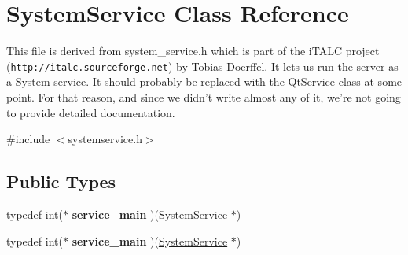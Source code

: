\hypertarget{class_system_service}{\section{System\-Service Class Reference}
\label{class_system_service}
}


This file is derived from system\-\_\-service.\-h which is part of the i\-T\-A\-L\-C project (\href{http://italc.sourceforge.net}{\tt http\-://italc.\-sourceforge.\-net}) by Tobias Doerffel. It lets us run the server as a System service. It should probably be replaced with the Qt\-Service class at some point. For that reason, and since we didn't write almost any of it, we're not going to provide detailed documentation.  




{\ttfamily \#include $<$systemservice.\-h$>$}

\subsection*{Public Types}
\begin{DoxyCompactItemize}
\item 
\hypertarget{class_system_service_ac937259220b62e8df8182f85bb9fa186}{typedef int($\ast$ {\bfseries service\-\_\-main} )(\hyperlink{class_system_service}{System\-Service} $\ast$)}\label{class_system_service_ac937259220b62e8df8182f85bb9fa186}

\item 
\hypertarget{class_system_service_ac937259220b62e8df8182f85bb9fa186}{typedef int($\ast$ {\bfseries service\-\_\-main} )(\hyperlink{class_system_service}{System\-Service} $\ast$)}\label{class_system_service_ac937259220b62e8df8182f85bb9fa186}

\end{DoxyCompactItemize}
